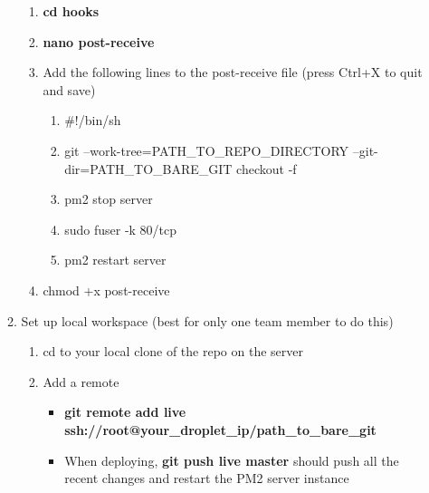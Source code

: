 \documentclass{article}
\begin{document}
\begin{enumerate}
\begin{enumerate}
\begin{enumerate}
      \item \textbf{cd hooks}
      \item \textbf{nano post-receive}
      \item Add the following lines to the post-receive file (press Ctrl+X to quit and save)
      \begin{enumerate}
        \item \#!/bin/sh
        \item git --work-tree=PATH\_TO\_REPO\_DIRECTORY --git-dir=PATH\_TO\_BARE\_GIT checkout -f
        \item pm2 stop server
        \item sudo fuser -k 80/tcp
        \item pm2 restart server
      \end{enumerate}
      \item chmod +x post-receive
    \end{enumerate}
    \item Set up local workspace (best for only one team member to do this)
    \begin{enumerate}
      \item cd to your local clone of the repo on the server
      \item Add a remote
      \begin{itemize}
        \item \textbf{git remote add live ssh://root@your\_droplet\_ip/path\_to\_bare\_git}
        \item When deploying, \textbf{git push live master} should push all the recent changes and restart the PM2 server instance
      \end{itemize}
    \end{enumerate}
  \end{enumerate}
\end{enumerate}
\end{document}
